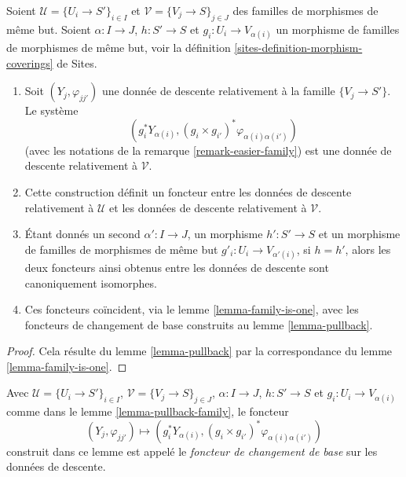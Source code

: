 \begin{lemma}
\label{lemma-pullback-family}
Soient $\mathcal{U} = \{U_i \to S'\}_{i \in I}$ et
$\mathcal{V} = \{V_j \to S\}_{j \in J}$ des familles de morphismes de même
but. Soient $\alpha : I \to J$, $h : S' \to S$ et
$g_i : U_i \to V_{\alpha(i)}$ un morphisme de familles de morphismes de même
but, voir la définition \ref{sites-definition-morphism-coverings} de Sites.
\begin{enumerate}
\item Soit $(Y_j, \varphi_{jj'})$ une donnée de descente relativement à la
famille $\{V_j \to S'\}$. Le système
$$
\left(
g_i^*Y_{\alpha(i)},
(g_i \times g_{i'})^*\varphi_{\alpha(i)\alpha(i')}
\right)
$$
(avec les notations de la remarque \ref{remark-easier-family}) est une donnée
de descente relativement à $\mathcal{V}$.
\item Cette construction définit un foncteur entre les données de descente
relativement à $\mathcal{U}$ et les données de descente relativement à
$\mathcal{V}$.
\item Étant donnés un second $\alpha' : I \to J$, un morphisme
$h' : S' \to S$ et un morphisme de familles de morphismes de même but
$g'_i : U_i \to V_{\alpha'(i)}$, si $h = h'$, alors les deux foncteurs ainsi
obtenus entre les données de descente sont canoniquement isomorphes.
\item Ces foncteurs coïncident, via le
lemme \ref{lemma-family-is-one}, avec les foncteurs de changement de base
construits au lemme \ref{lemma-pullback}.
\end{enumerate}
\end{lemma}

\begin{proof}
Cela résulte du lemme \ref{lemma-pullback} par la correspondance du
lemme \ref{lemma-family-is-one}.
\end{proof}

\begin{definition}
\label{definition-pullback-functor-family}
Avec $\mathcal{U} = \{U_i \to S'\}_{i \in I}$,
$\mathcal{V} = \{V_j \to S\}_{j \in J}$, $\alpha : I \to J$,
$h : S' \to S$ et $g_i : U_i \to V_{\alpha(i)}$ comme dans le
lemme \ref{lemma-pullback-family}, le foncteur
$$
(Y_j, \varphi_{jj'}) \longmapsto
(g_i^*Y_{\alpha(i)}, (g_i \times g_{i'})^*\varphi_{\alpha(i)\alpha(i')})
$$
construit dans ce lemme est appelé le {\it foncteur de changement de base}
sur les données de descente.
\end{definition}

